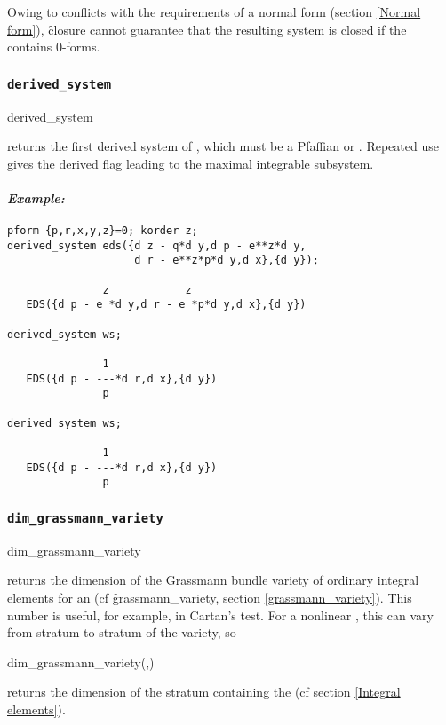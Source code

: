 Owing to conflicts with the requirements of a normal form (section
\ref{Normal form}), \f{closure} cannot guarantee that the resulting system
is closed if the  contains 0-forms.

\subsubsection{\tt derived\_system}
\label{derived_system}

\begin{edssyntax}
	derived\_system 
\end{edssyntax}
returns the first derived system of , which must be a Pfaffian
 or . Repeated use gives the derived flag leading to
the maximal integrable subsystem.

\paragraph{\it Example:}
\begin{verbatim}
pform {p,r,x,y,z}=0; korder z;
derived_system eds({d z - q*d y,d p - e**z*d y,
                    d r - e**z*p*d y,d x},{d y});

               z            z
   EDS({d p - e *d y,d r - e *p*d y,d x},{d y}) 

derived_system ws;

               1
   EDS({d p - ---*d r,d x},{d y})
               p 

derived_system ws;

               1
   EDS({d p - ---*d r,d x},{d y})
               p 
\end{verbatim}

\subsubsection{\tt dim\_grassmann\_variety}
\label{dim_grassmann_variety}

\begin{edssyntax}
	dim\_grassmann\_variety 
\end{edssyntax}
returns the dimension of the Grassmann bundle variety of ordinary integral
elements for an  (cf \f{grassmann\_variety}, section
\ref{grassmann_variety}). This number is useful, for example, in Cartan's
test. For a nonlinear , this can vary from stratum to stratum of
the variety, so
\begin{edssyntax}
	dim\_grassmann\_variety(,)
\end{edssyntax}
returns the dimension of the stratum containing the 
(cf section \ref{Integral elements}).

